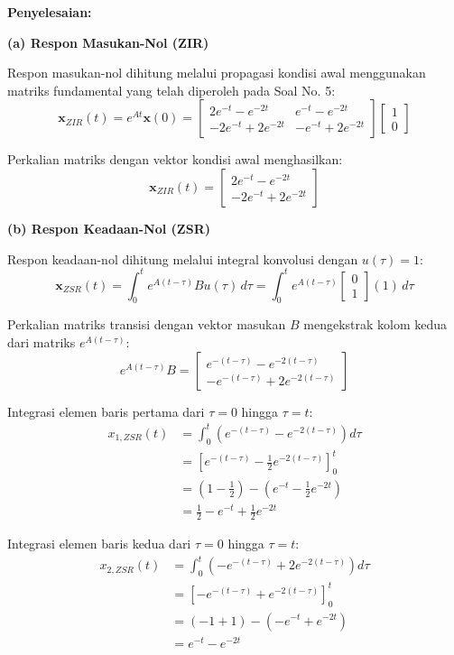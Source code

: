\documentclass[11pt,a4paper]{article}
\begin{document}
\textbf{Penyelesaian:}

\textbf{(a) Respon Masukan-Nol (ZIR)}

Respon masukan-nol dihitung melalui propagasi kondisi awal menggunakan matriks fundamental yang telah diperoleh pada Soal No. 5:
$$\mathbf{x}_{ZIR}(t) = e^{At} \mathbf{x}(0) = \begin{bmatrix} 2e^{-t} - e^{-2t} & e^{-t} - e^{-2t} \\ -2e^{-t} + 2e^{-2t} & -e^{-t} + 2e^{-2t} \end{bmatrix} \begin{bmatrix} 1 \\ 0 \end{bmatrix}$$

Perkalian matriks dengan vektor kondisi awal menghasilkan:
$$\mathbf{x}_{ZIR}(t) = \begin{bmatrix} 2e^{-t} - e^{-2t} \\ -2e^{-t} + 2e^{-2t} \end{bmatrix}$$

\textbf{(b) Respon Keadaan-Nol (ZSR)}

Respon keadaan-nol dihitung melalui integral konvolusi dengan $u(\tau) = 1$:
$$\mathbf{x}_{ZSR}(t) = \int_0^t e^{A(t-\tau)} B u(\tau) \, d\tau = \int_0^t e^{A(t-\tau)} \begin{bmatrix} 0 \\ 1 \end{bmatrix} (1) \, d\tau$$

Perkalian matriks transisi dengan vektor masukan $B$ mengekstrak kolom kedua dari matriks $e^{A(t-\tau)}$:
$$e^{A(t-\tau)} B = \begin{bmatrix} e^{-(t-\tau)} - e^{-2(t-\tau)} \\ -e^{-(t-\tau)} + 2e^{-2(t-\tau)} \end{bmatrix}$$

Integrasi elemen baris pertama dari $\tau = 0$ hingga $\tau = t$:
\begin{align*}
    x_{1, ZSR}(t) &= \int_0^t \left( e^{-(t-\tau)} - e^{-2(t-\tau)} \right) d\tau \\
    &= \left[ e^{-(t-\tau)} - \frac{1}{2} e^{-2(t-\tau)} \right]_0^t \\
    &= \left( 1 - \frac{1}{2} \right) - \left( e^{-t} - \frac{1}{2}e^{-2t} \right) \\
    &= \frac{1}{2} - e^{-t} + \frac{1}{2}e^{-2t}
\end{align*}

Integrasi elemen baris kedua dari $\tau = 0$ hingga $\tau = t$:
\begin{align*}
    x_{2, ZSR}(t) &= \int_0^t \left( -e^{-(t-\tau)} + 2e^{-2(t-\tau)} \right) d\tau \\
    &= \left[ -e^{-(t-\tau)} + e^{-2(t-\tau)} \right]_0^t \\
    &= (-1 + 1) - \left( -e^{-t} + e^{-2t} \right) \\
    &= e^{-t} - e^{-2t}
\end{align*}
\end{document}
